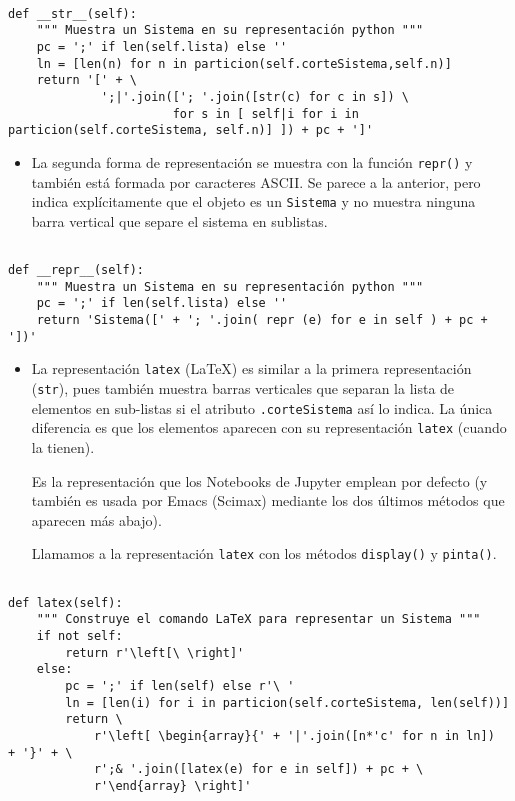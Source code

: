 \documentclass[11pt]{report}
\begin{document}
\begin{verbatim}

def __str__(self):
    """ Muestra un Sistema en su representación python """
    pc = ';' if len(self.lista) else ''
    ln = [len(n) for n in particion(self.corteSistema,self.n)]
    return '[' + \
             ';|'.join(['; '.join([str(c) for c in s]) \
                       for s in [ self|i for i in particion(self.corteSistema, self.n)] ]) + pc + ']'

\end{verbatim}

\begin{itemize}
\item La segunda forma de representación se muestra con la función
\texttt{repr()} y también está formada por caracteres ASCII. Se parece a la
anterior, pero indica explícitamente que el objeto es un \texttt{Sistema} y
no muestra ninguna barra vertical que separe el sistema en
sublistas.
\end{itemize}



\begin{verbatim}

def __repr__(self):
    """ Muestra un Sistema en su representación python """
    pc = ';' if len(self.lista) else ''
    return 'Sistema([' + '; '.join( repr (e) for e in self ) + pc + '])'

\end{verbatim}


\begin{itemize}
\item La representación \texttt{latex} (\LaTeX{}) es similar a la primera
representación (\texttt{str}), pues también muestra barras
verticales que separan la lista de elementos en sub-listas si el
atributo \texttt{.corteSistema} así lo indica. La única diferencia es que los
elementos aparecen con su representación \texttt{latex} (cuando la
tienen).

Es la representación que los Notebooks de Jupyter emplean por
defecto (y también es usada por Emacs (Scimax) mediante los dos
últimos métodos que aparecen más abajo).

Llamamos a la representación \texttt{latex} con los métodos \texttt{display()} y
\texttt{pinta()}.
\end{itemize}


\begin{verbatim}

def latex(self):
    """ Construye el comando LaTeX para representar un Sistema """
    if not self:
        return r'\left[\ \right]'
    else:
        pc = ';' if len(self) else r'\ '
        ln = [len(i) for i in particion(self.corteSistema, len(self))]
        return \
            r'\left[ \begin{array}{' + '|'.join([n*'c' for n in ln])  + '}' + \
            r';& '.join([latex(e) for e in self]) + pc + \
            r'\end{array} \right]'

\end{verbatim}
\end{document}
